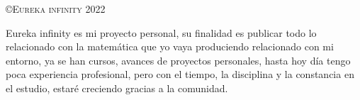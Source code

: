 \thispagestyle{empty}
\vspace*{0.5cm}
\begin{flushleft}
	{\Large\scshape \copyright Eureka infinity 2022\\[5pt] }
\end{flushleft}

\vspace*{1cm}
\begin{flushleft}
\end{flushleft}

\vspace*{1cm}
\begin{flushleft}
	{\Large\scshape }
\end{flushleft}

\vspace*{2cm}
\begin{flushleft}
	{\large\scshape     }
\end{flushleft}

\vspace*{2cm}
\begin{flushleft}
	{Eureka infinity es mi proyecto personal, su finalidad es publicar todo lo relacionado con la matem\'atica que yo vaya produciendo relacionado con mi entorno,	ya se han cursos, avances de proyectos personales, hasta hoy d\'ia tengo poca experiencia profesional, pero con el tiempo, la disciplina y la constancia en el estudio, estar\'e creciendo gracias a la comunidad.
	 }
\end{flushleft}







